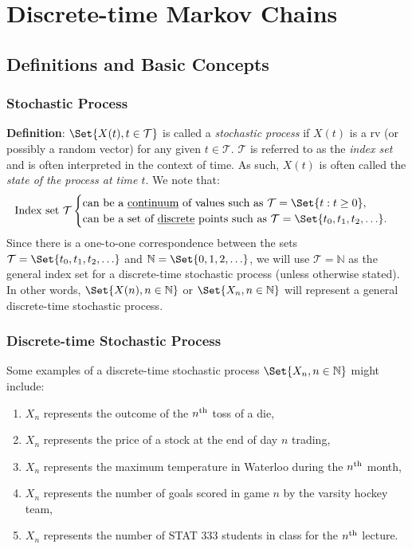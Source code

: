 \chapter{Discrete-time Markov Chains}
\section{Definitions and Basic Concepts}
\subsection*{Stochastic Process}
\begin{Regular}
    \textbf{Definition}: $ \Set{X(t), t\in\mathcal{T}} $ is called a \emph{stochastic process}
    if $ X(t) $ is a rv (or possibly a random vector) for any given $ t\in\mathcal{T} $.
    $ \mathcal{T} $ is referred to as the \emph{index set} and is often interpreted in
    the context of time. As such, $ X(t) $ is often called the \emph{state of the process at time $ t $}.
    We note that:
    \[ \text{Index set $ \mathcal{T} $}\begin{cases}
            \text{can be a \underline{continuum} of values such as $ \mathcal{T}=\Set{t\given t\ge 0} $}, \\
            \text{can be a set of \underline{discrete} points such as $ \mathcal{T}=\Set{t_0,t_1,t_2,\ldots} $}.
        \end{cases} \]
    Since there is a one-to-one correspondence between the sets $ \mathcal{T}=\Set{t_0,t_1,t_2,\ldots} $
    and $ \mathbb{N}=\Set{0,1,2,\ldots} $, we will use $ \mathcal{T}=\mathbb{N} $ as the general index set for a discrete-time
    stochastic process (unless otherwise stated). In other words, $ \Set{X(n), n\in\mathbb{N}} $ or $ \Set{X_n, n\in\mathbb{N}} $
    will represent a general discrete-time stochastic process.
\end{Regular}
\subsection*{Discrete-time Stochastic Process}
Some examples of a discrete-time stochastic process $ \Set{X_n,n\in\mathbb{N}} $ might include:
\begin{enumerate}[(1)]
    \item $ X_n $ represents the outcome of the $n\textsuperscript{th}$ toss of a die,
    \item $ X_n $ represents the price of a stock at the end of day $n$ trading,
    \item $ X_n $ represents the maximum temperature in Waterloo during the $n\textsuperscript{th}$ month,
    \item $ X_n $ represents the number of goals scored in game $n$ by the varsity hockey team,
    \item $ X_n $ represents the number of STAT 333 students in class for the $n\textsuperscript{th}$ lecture.
\end{enumerate}
